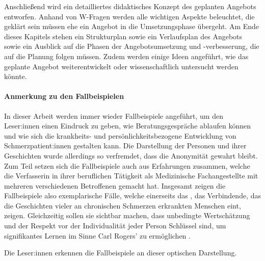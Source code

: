 \documentclass[
  twoside,
  parskip=half-,
]{scrreprt}
\begin{document}
Anschließend wird ein detailliertes didaktisches Konzept des geplanten Angebots entworfen. Anhand von W-Fragen werden alle wichtigen Aspekte beleuchtet, die geklärt sein müssen ehe ein Angebot in die Umsetzungsphase übergeht. Am Ende dieses Kapitels stehen ein Strukturplan sowie ein Verlaufsplan des Angebots sowie ein Ausblick auf die Phasen der Angebotsumsetzung und -verbesserung, die auf die Planung folgen müssen. Zudem werden einige Ideen angeführt, wie das geplante Angebot weiterentwickelt oder wissenschaftlich untersucht werden könnte.

\paragraph{Anmerkung zu den Fallbeispielen}In dieser Arbeit werden immer wieder Fallbeispiele angeführt, um den Leser:innen einen Eindruck zu geben, wie Beratungsgespräche ablaufen können und wie sich die krankheits- und persönlichkeitsbezogene Entwicklung von Schmerzpatient:innen gestalten kann. Die Darstellung der Personen und ihrer Geschichten wurde allerdings so verfremdet, dass die Anonymität gewahrt bleibt. Zum Teil setzen sich die Fallbeispiele auch aus Erfahrungen zusammen, welche die Verfasserin in ihrer beruflichen Tätigkeit als Medizinische Fachangestellte mit mehreren verschiedenen Betroffenen gemacht hat. Insgesamt zeigen die Fallbeispiele also exemplarische Fälle, welche einerseits das , das Verbindende, das die Geschichten vieler an chronischen Schmerzen erkrankten Menschen eint, zeigen. Gleichzeitig sollen sie sichtbar machen, dass unbedingte Wertschätzung und der Respekt vor der Individualität jeder Person Schlüssel sind, um signifikantes Lernen im Sinne Carl Rogers' zu ermöglichen \autocite[vgl.][153f.]{rogersLernenFreiheit}.

\begin{beispiel}
  Die Leser:innen erkennen die Fallbeispiele an dieser optischen Darstellung.
\end{beispiel}
\end{document}
